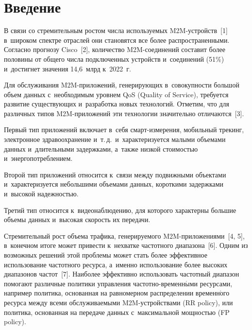 \begin{multicols}{2}

\label{st\stat}

\section{Введение}

\vspace*{-2pt}

  В связи со стремительным ростом числа используемых M2M-устройств~[1] 
в~широком спектре отраслей они становятся все более распространенными. 
Согласно прогнозу Cisco~[2], количество M2M-со\-еди\-не\-ний составит более 
половины от общего числа подключенных устройств и~соединений (51\%) 
и~достигнет значения 14,6~млрд к~2022~г. 

Для обслуживания  
M2M-при\-ло\-же\-ний, генерирующих в~совокупности большой объем данных с~необходимым уровнем QoS (Quality of Service), требуется развитие 
существующих и~разработка новых технологий. Отметим, что для различных 
типов M2M-приложений эти технологии значительно отличаются~[3]. 

Первый 
тип приложений включает в~себя смарт-из\-ме\-ре\-ния, мобильный трекинг, 
электронное здравоохранение и~т.\,д.\ и~характеризуется малыми объемами 
данных и~длительными задержками, а~также низкой стоимостью 
и~энергопотреблением. 

Второй тип приложений относится к~связи между 
подвижными объектами и~характеризуется небольшими объемами данных, 
короткими задержками и~высокой надежностью. 

Третий тип относится 
к~видеонаблюдению, для которого характерны большие объемы данных 
и~высокая скорость их передачи. 
  
  Стремительный рост объема трафика, генерируемого  
M2M-при\-ло\-же\-ни\-ями~[4, 5], в~конечном \mbox{итоге} может привести к~нехватке 
частотного диапазона~[6]. Одним из возможных решений этой проб\-ле\-мы 
может стать более эффективное использование частотного ресурса, а~именно 
использование более высоких диапазонов час\-тот~[7]. Наиболее эффективно 
использовать частотный диапазон помогают различные политики управления 
час\-тот\-но-вре\-мен\-н$\acute{\mbox{ы}}$\-ми ресурсами, например политика, основанная на 
равномерном распределении временн$\acute{\mbox{о}}$го ресурса между всеми 
обслуживаемыми M2M-устрой\-ст\-ва\-ми (RR policy), или политика, 
основанная на передаче данных с~максимальной мощностью (FP policy). 
  

\end{multicols}

